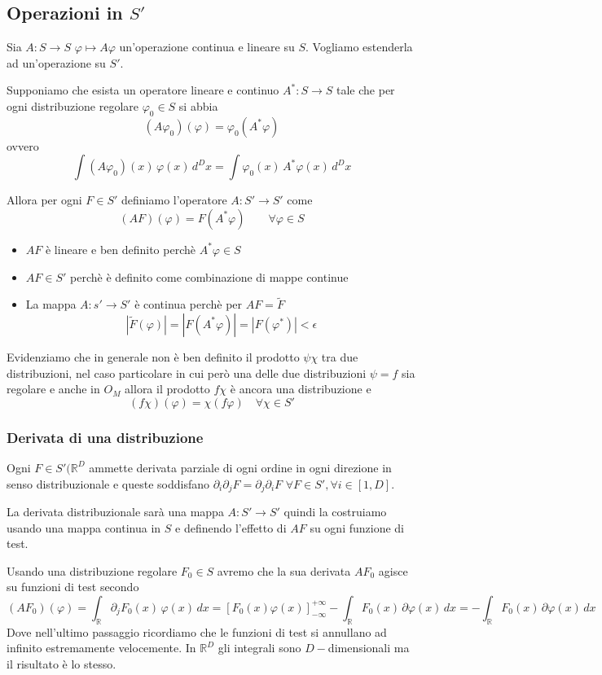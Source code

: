 \documentclass[11pt,a4paper,twoside]{book}
\theoremstyle{esss}
\theoremstyle{dotless}
\numberwithin{equation}{section} %
\begin{document}
\subsection{Operazioni in $S'$}

Sia $A:S\rightarrow S$ $\varphi\mapsto A\varphi$ un'operazione continua e lineare su $S$. Vogliamo estenderla ad un'operazione su $S'$.

Supponiamo che esista un operatore lineare e continuo $A^*:S\rightarrow S$ tale che per ogni distribuzione regolare $\varphi_0\in S$ si abbia
\[
(A\varphi_0)(\varphi)=\varphi_0 (A^*\varphi)
\]
ovvero
\[
\int (A\varphi_0)(x)\,\varphi(x)\,d^Dx = \int \varphi_0(x)\,A^*\varphi(x)\,d^Dx
\]

Allora per ogni $F\in S'$ definiamo l'operatore $A:S'\rightarrow S'$ come 
\[
(AF)(\varphi)=F(A^*\varphi) \qquad \forall \varphi\in S
\]

\begin{itemize}[label=$\cdot$]
\item $AF$ è lineare e ben definito perchè $A^*\varphi\in S$
\item $AF\in S'$ perchè è definito come combinazione di mappe continue
\item La mappa $A:s'\rightarrow S'$ è continua perchè per $AF=\tilde{F}$
\[
|\tilde{F}(\varphi)|=|F(A^*\varphi)|=|F(\varphi^*)|<\epsilon
\]
\end{itemize}

Evidenziamo che in generale non è ben definito il prodotto $\psi\chi$ tra due distribuzioni, nel caso particolare in cui però una delle due distribuzioni $\psi=f$ sia regolare e anche in $O_M$ allora il prodotto $f\chi$ è ancora una distribuzione e 
\[
(f\chi)(\varphi)=\chi(f\varphi) \quad \forall \chi\in S'
\]


\subsubsection{Derivata di una distribuzione}

Ogni $F\in S'(\mathbb{R}^D$ ammette derivata parziale di ogni ordine in ogni direzione in senso distribuzionale e queste soddisfano $\partial_i\partial_j F=\partial_j\partial_i F$ $\forall F\in S',\forall i\in[1,D]$.

La derivata distribuzionale sarà una mappa $A:S'\rightarrow S'$ quindi la costruiamo usando una mappa continua in $S$ e definendo l'effetto di $A F$ su ogni funzione di test.

Usando una distribuzione regolare $F_0\in S$ avremo che la sua derivata $AF_0$ agisce su funzioni di test secondo
\[
(AF_0)(\varphi)=\int_{\mathbb{R}} \partial_j F_0(x)\, \varphi(x)\,dx = [F_0(x)\varphi(x)]_{-\infty}^{+\infty} -\int_{\mathbb{R}} F_0(x)\,\partial\varphi(x)\,dx=-\int_\mathbb{R} F_0(x)\,\partial\varphi(x)\,dx
\]
Dove nell'ultimo passaggio ricordiamo che le funzioni di test si annullano ad infinito estremamente velocemente. In $\mathbb{R}^D$ gli integrali sono $D-$dimensionali ma il risultato è lo stesso.
\end{document}
